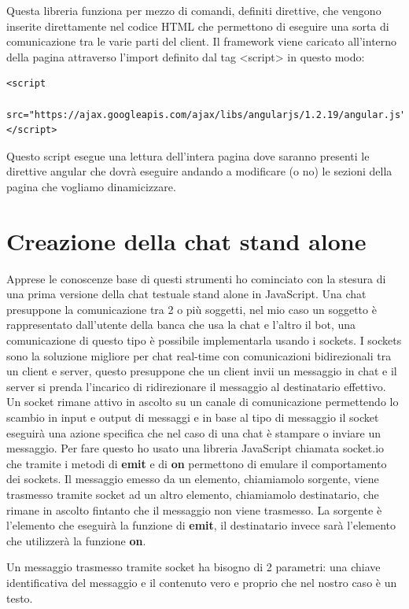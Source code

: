 Questa libreria funziona per mezzo di comandi, definiti direttive, che vengono inserite direttamente nel codice HTML che permettono di eseguire una sorta di comunicazione tra le varie parti del client. Il framework viene caricato all'interno della pagina attraverso l'import definito dal tag <script> in questo modo:
\begin{lstlisting}[language=betterHtml]
<script
 src="https://ajax.googleapis.com/ajax/libs/angularjs/1.2.19/angular.js">
</script>
\end{lstlisting}
Questo script esegue una lettura dell'intera pagina dove saranno presenti le direttive angular che dovrà eseguire andando a modificare (o no) le sezioni della pagina che vogliamo dinamicizzare.


\section{Creazione della chat stand alone}
Apprese le conoscenze base di questi strumenti ho cominciato con la stesura di una prima versione della chat testuale stand alone in JavaScript. Una chat presuppone la comunicazione tra 2 o più soggetti, nel mio caso un soggetto è rappresentato dall'utente della banca che usa la chat e l'altro il bot, una comunicazione di questo tipo è possibile implementarla usando i sockets.
I sockets sono la soluzione migliore per chat real-time con comunicazioni bidirezionali tra un client e server, questo presuppone che un client invii un messaggio in chat e il server si prenda l'incarico di ridirezionare il messaggio al destinatario effettivo. Un socket rimane attivo in ascolto su un canale di comunicazione permettendo lo scambio in input e output di messaggi e in base al tipo di messaggio il socket eseguirà una azione specifica che nel caso di una chat è stampare o inviare un messaggio. Per fare questo ho usato una libreria JavaScript chiamata socket.io  che tramite i metodi di \textbf{emit} e di \textbf{on} permettono di emulare il comportamento dei sockets.
Il messaggio emesso da un elemento, chiamiamolo sorgente, viene trasmesso tramite socket ad un altro elemento, chiamiamolo destinatario, che rimane in ascolto fintanto che il messaggio non viene trasmesso. La sorgente è l'elemento che eseguirà la funzione di \textbf{emit}, il destinatario invece sarà l'elemento che utilizzerà la funzione \textbf{on}.

Un messaggio trasmesso tramite socket ha bisogno di 2 parametri: una chiave identificativa del messaggio e il contenuto vero e proprio che nel nostro caso è un testo. 

